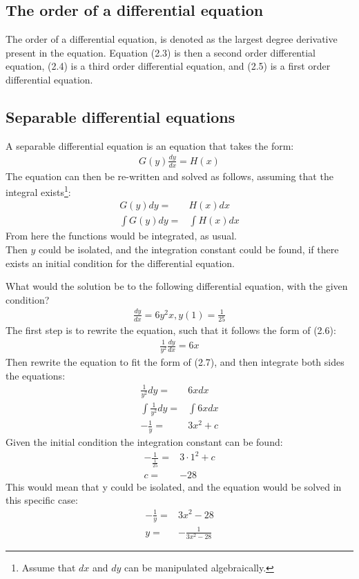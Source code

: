 \subsection{The order of a differential equation}
The order of a differential equation, is denoted as the largest degree derivative present in the equation. Equation (2.3) is then a second order differential equation, (2.4) is a third order differential equation, and (2.5) is a first order differential equation.

\subsection{Separable differential equations}
A separable differential equation is an equation that takes the form:
\begin{align}
	G(y)\frac{dy}{dx}=H(x)
\end{align}
The equation can then be re-written and solved as follows, assuming that the integral exists\footnote{Assume that $dx$ and $dy$ can be manipulated algebraically. }:
\begin{align}
	G(y)dy=&H(x)dx				\\
	\int G(y)dy =& \int H(x)dx
\end{align}
From here the functions would be integrated, as usual.\\
Then $y$ could be isolated, and the integration constant could be found, if there exists an initial condition for the differential equation.
\begin{tcolorbox}[colback=red!5!white,colframe=red!75!black,title=Example] 
What would the solution be to the following differential equation, with the given condition?
\begin{align*}
	\frac{dy}{dx} = 6y^2x, y(1)=\frac{1}{25}
\end{align*}
The first step is to rewrite the equation, such that it follows the form of (2.6):
\begin{align*}
	\frac{1}{y^2}\frac{dy}{dx}=6x
\end{align*}
Then rewrite the equation to fit the form of (2.7), and then integrate both sides the equations:
\begin{align*}
	\frac{1}{y^2}dy=&6x dx				\\
	\int \frac{1}{y^2}dy=&\int 6x dx		\\
	-\frac{1}{y}=&3x^2+c		
\end{align*}
Given the initial condition the integration constant can be found:
\begin{align*}
	-\frac{1}{\frac{1}{25}}=&3\cdot 1^2+c	\\
	c=&-28
\end{align*}
This would mean that y could be isolated, and the equation would be solved in this specific case:
\begin{align*}
	-\frac{1}{y}=&3x^2-28\\
	y=&-\frac{1}{3x^2-28}
\end{align*}
\end{tcolorbox}